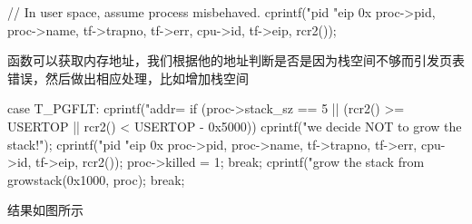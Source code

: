 \begin{ccode}
    // In user space, assume process misbehaved.
    cprintf("pid %
            "eip 0x%
            proc->pid, proc->name, tf->trapno, tf->err, cpu->id, tf->eip, 
            rcr2());
\end{ccode}

 函数可以获取内存地址，我们根据他的地址判断是否是因为栈空间不够而引发页表错误，然后做出相应处理，比如增加栈空间

\begin{ccode}
    case T_PGFLT:
    cprintf("addr=%
    if (proc->stack_sz == 5 || (rcr2() >= USERTOP || rcr2() < USERTOP - 0x5000)) {
      cprintf("we decide NOT to grow the stack!\n");
      cprintf("pid %
            "eip 0x%
            proc->pid, proc->name, tf->trapno, tf->err, cpu->id, tf->eip, 
            rcr2());
      proc->killed = 1;
      break;
    }
    cprintf("grow the stack from %
    growstack(0x1000, proc);
    break;
\end{ccode}

结果如图所示

